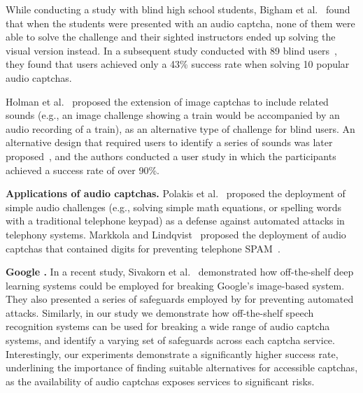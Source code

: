 While conducting a study with blind high school students, Bigham et al.~\cite{bigham2008inspiring}
found that when the students were presented with an audio captcha, none of them were able to solve the challenge 
and their sighted instructors ended up solving the visual version instead. In a subsequent
study conducted with 89 blind users~\cite{bigham2009evaluating}, they found that users achieved 
only a 43\% success rate when solving 10 popular audio captchas.

Holman et al.~\cite{holman2007developing} proposed the extension of image captchas to include related
sounds (e.g., an image challenge showing a train would be accompanied by an audio recording of a train), 
as an alternative type of challenge for blind users. An alternative design that required users to identify 
a series of sounds was later proposed~\cite{Lazar:2012}, and the authors conducted a user study in which the
participants achieved a success rate of over 90\%.

\textbf{Applications of audio captchas.} Polakis et al.~\cite{polakis:syssec11} proposed the deployment of 
simple audio challenges (e.g., solving simple math equations, or spelling words with a traditional telephone keypad)
as a defense against automated attacks in telephony systems. Markkola and Lindqvist~\cite{markkola2008accessible}
proposed the deployment of audio captchas that contained digits for preventing telephone SPAM~\cite{sok-robocalls}.

\textbf{Google \re.} In a recent study, Sivakorn et al.~\cite{sivakorn:eurosp16} demonstrated how off-the-shelf 
deep learning systems could be employed for breaking Google's image-based \re system. They also presented a series 
of safeguards employed by \re for preventing automated attacks. Similarly, in our study we demonstrate how off-the-shelf 
speech recognition systems can be used for breaking a wide range of audio captcha systems, and identify a varying set
of safeguards across each captcha service. Interestingly, our experiments demonstrate a significantly higher success rate,
underlining the importance of finding suitable alternatives for accessible captchas, as the availability of audio captchas 
exposes services to significant risks.
